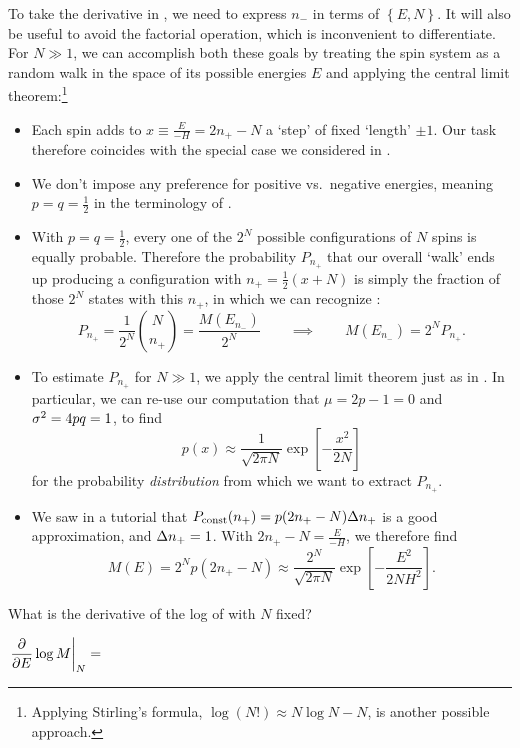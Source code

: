 To take the derivative in , we need to express $n_-$ in terms of $\left\{E, N\right\}$.
It will also be useful to avoid the factorial operation, which is inconvenient to differentiate.
For $N \gg 1$, we can accomplish both these goals by treating the spin system as a random walk in the space of its possible energies $E$ and applying the central limit theorem:\footnote{Applying Stirling's formula, $\log(N!) \approx N \log N - N$, is another possible approach.} \\[-24 pt]
\begin{itemize} %
  \item Each spin adds to $x \equiv \frac{E}{-H} = 2n_+ - N$ a `step' of fixed `length' $\pm 1$.
        Our task therefore coincides with the special case we considered in .
  \item We don't impose any preference for positive vs.\ negative energies, meaning $p = q = \frac{1}{2}$ in the terminology of .
  \item With $p = q = \frac{1}{2}$, every one of the $2^N$ possible configurations of $N$ spins is equally probable.
        Therefore the probability $P_{n_+}$ that our overall `walk' ends up producing a configuration with $n_+ = \frac{1}{2}\left(x + N\right)$ is simply the fraction of those $2^N$ states with this $n_+$, in which we can recognize :
        \begin{equation*}
          P_{n_+} = \frac{1}{2^N} \binom{N}{n_+} = \frac{M(E_{n_-})}{2^N} \qquad \implies \qquad M(E_{n_-}) = 2^N P_{n_+}.
        \end{equation*}
  \item To estimate $P_{n_+}$ for $N \gg 1$, we apply the central limit theorem just as in .
        In particular, we can re-use our computation that $\mu = 2p - 1 = 0$ and $\sigma^2 = 4pq = 1$, to find
        \begin{equation*}
          p(x) \approx \frac{1}{\sqrt{2\pi N}}\exp\left[-\frac{x^2}{2N}\right]
        \end{equation*}
        for the probability \textit{distribution} from which we want to extract $P_{n_+}$.
  \item We saw in a tutorial that $P_{\text{const}}(n_+) = p(2n_+ - N) \Delta n_+$ is a good approximation, and $\Delta n_+ = 1$.
        With $2n_+ - N = \frac{E}{-H}$, we therefore find
        \begin{equation}
          \label{eq:CLT_states}
          M(E) = 2^N p(2n_+ - N) \approx \frac{2^N}{\sqrt{2\pi N}}\exp\left[-\frac{E^2}{2NH^2}\right].
        \end{equation}
\end{itemize}
What is the derivative of the log of  with $N$ fixed?
\begin{mdframed}
  $\displaystyle \left.\frac{\partial }{\partial E} \log M\right|_N = $ \\[100 pt]
\end{mdframed}


